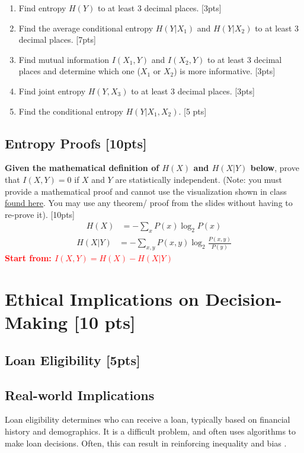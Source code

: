 \documentclass{article}
\begin{document}
\begin{enumerate}[label=(\alph*)]
    \item Find entropy $H(Y)$ to at least 3 decimal places. [3pts]
    \item Find the average conditional entropy $H(Y|X_1)$ and $H(Y|X_2)$ to at least 3 decimal places. [7pts]
    \item Find mutual information $I(X_1, Y)$ and $I(X_2, Y)$ to at least 3 decimal places and determine which one ($X_1$ or $X_2$) is more informative. [3pts]
    \item Find joint entropy $H(Y, X_3)$ to at least 3 decimal places. [3pts]
    \item Find the conditional entropy $H(Y|X_1, X_2)$. [5 pts]
\end{enumerate}

\newpage



\subsection{Entropy Proofs [10pts]}

\textbf{Given the mathematical definition of $H(X)$ and $H(X|Y)$ below}, prove that $I(X,Y) = 0$ if $X$ and $Y$ are statistically independent. (Note: you must provide a mathematical proof and cannot use the visualization shown in class \href{https://mahdi-roozbahani.github.io/CS46417641-summer2022/other/CEandMI_Illustration.jpg}{found here}. You may use any theorem/ proof from the slides without having to re-prove it). [10pts] \\
\newline
\begin{align*}
    H(X) &= -\sum_{x}P(x)\log_2P(x)
\end{align*}
\begin{align*}
    H(X|Y) &= -\sum_{x,y}P(x,y)\log_2\frac{P(x,y)}{P(y)}
\end{align*}
\textcolor{red}{\textbf{Start from: $I(X,Y) = H(X)-H(X|Y)$}}

\newpage

\section{Ethical Implications on Decision-Making [10 pts]}
\subsection{Loan Eligibility [5pts]}
\subsection*{Real-world Implications}
Loan eligibility determines who can receive a loan, typically based on financial history and demographics. It is a difficult problem, and often uses algorithms to make loan decisions. Often, this can result in reinforcing inequality and bias \cite{oneil}.\\
\end{document}
